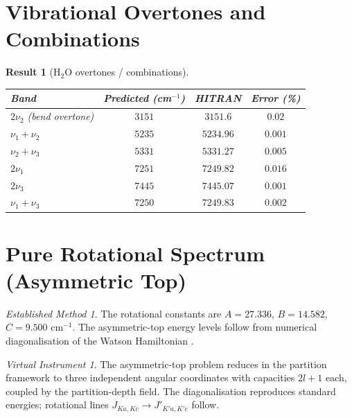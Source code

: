 \documentclass[twocolumn,11pt,a4paper]{article}
\theoremstyle{stmtstyle}
\newtheorem{result}{Result}
\theoremstyle{definition}
\theoremstyle{remark}
\newtheorem*{instrument}{Virtual Instrument}
\newtheorem*{established}{Established Method}
\begin{document}
\section{Vibrational Overtones and Combinations}
\label{sec:h2oovertones}

\begin{result}[H$_{2}$O overtones / combinations]\label{res:h2oovertones}
\begin{center}\small
\begin{tabular}{lccc}
\toprule
Band & Predicted (cm$^{-1}$) & HITRAN \citep{hitran2020} & Error (\%)\\
\midrule
$2\nu_{2}$ (bend overtone)  & $3151$ & $3151.6$ & $0.02$\\
$\nu_{1}+\nu_{2}$           & $5235$ & $5234.96$& $0.001$\\
$\nu_{2}+\nu_{3}$           & $5331$ & $5331.27$& $0.005$\\
$2\nu_{1}$                  & $7251$ & $7249.82$& $0.016$\\
$2\nu_{3}$                  & $7445$ & $7445.07$& $0.001$\\
$\nu_{1}+\nu_{3}$           & $7250$ & $7249.83$& $0.002$\\
\bottomrule
\end{tabular}
\end{center}
\end{result}

\section{Pure Rotational Spectrum (Asymmetric Top)}
\label{sec:h2orot}

\begin{established}
The rotational constants are $A=27.336$, $B=14.582$, $C=9.500$ cm$^{-1}$. The asymmetric-top energy levels follow from numerical diagonalisation of the Watson Hamiltonian \citep{watson1968}.
\end{established}

\begin{instrument}
The asymmetric-top problem reduces in the partition framework to three independent angular coordinates with capacities $2l+1$ each, coupled by the partition-depth field. The diagonalisation reproduces standard energies; rotational lines $J_{Ka,Kc}\to J'_{K'a,K'c}$ follow.
\end{instrument}
\end{document}

